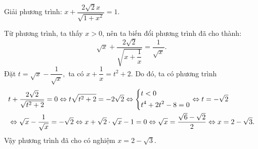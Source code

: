 \begin{ex}
{    {  }
    
    }
\end{ex}

\begin{ex}%
    Giải phương trình: $x+\dfrac{2\sqrt{2}x}{\sqrt{1+x^2}}=1.$

\loigiai
    { 
Từ phương trình, ta thấy $x>0$, nên ta biến đổi phương trình đã cho thành:
    $$\sqrt{x}+\dfrac{2\sqrt{2}}{\sqrt{x+\dfrac{1}{x}}}=\dfrac{1}{\sqrt{x}}.$$
    Đặt $t=\sqrt{x}-\dfrac{1}{\sqrt{x}},$ ta có $x+\dfrac{1}{x}=t^2+2$. Do đó, ta có phương trình
    $$ \begin{aligned} &t +\dfrac{2\sqrt{2}}{\sqrt{t^2+2}}=0 \Leftrightarrow t\sqrt{t^2+2}=-2\sqrt{2} \Leftrightarrow \left\{\begin{aligned}&t<0 \\ &t^4+2t^2-8 =0\end{aligned}\right. \Leftrightarrow t=-\sqrt{2} \\& \Leftrightarrow\sqrt{x}-\dfrac{1}{\sqrt{x}}=-\sqrt{2} \Leftrightarrow x+\sqrt{2}\cdot \sqrt{x}-1=0 \Leftrightarrow \sqrt{x}=\dfrac{\sqrt{6}-\sqrt{2}}{2} \Leftrightarrow x= 2-\sqrt{3}. \end{aligned}$$
    Vậy phương trình đã cho có nghiệm $x=2-\sqrt{3}.$
    }
\end{ex}

